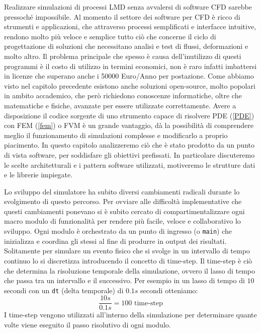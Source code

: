 Realizzare simulazioni di processi LMD senza avvalersi di software CFD sarebbe pressoché impossibile.
Al momento il settore dei software per CFD è ricco di strumenti e applicazioni, che attraverso processi semplificati e interfacce intuitive,
rendono molto più veloce e semplice tutto ciò che concerne il ciclo di progettazione di soluzioni che necessitano
analisi e test di flussi, deformazioni e molto altro.
Il problema principale che spesso è causa dell'inutilizzo di questi programmi è il costo di utilizzo in termini economici,
non è raro infatti imbattersi in licenze che superano anche i 50000 Euro/Anno per postazione.
Come abbiamo visto nel capitolo precedente esistono anche soluzioni open-source, molto popolari in ambito accademico, che però
richiedono conoscenze informatiche, oltre che matematiche e fisiche, avanzate per essere utilizzate correttamente. Avere a disposizione
il codice sorgente di uno strumento capace di risolvere PDE (\ref{PDE}) con FEM (\ref*{fem}) o FVM è un grande vantaggio, dà la possibilità di
comprendere meglio il funzionamento di simulazioni complesse e modificarlo a proprio piacimento.
In questo capitolo analizzeremo ciò che è stato prodotto da un punto di vista software, per soddisfare gli obiettivi prefissati.
In particolare discuteremo le scelte architetturali e i pattern software utilizzati, motiveremo le strutture dati e le librerie impiegate.

Lo sviluppo del simulatore ha subito diversi cambiamenti radicali durante lo svolgimento di questo percorso. Per ovviare alle difficoltà implementative
che questi cambiamenti ponevano si è subito cercato di compartimentalizzare ogni macro modulo di funzionalità per rendere più facile, veloce e collaborativo lo sviluppo.
Ogni modulo è orchestrato da un punto di ingresso (o \texttt{main}) che inizializza e coordina gli stessi al fine di produrre in output dei risultati.
Solitamente per simulare un evento fisico che si svolge in un intervallo di tempo continuo lo si discretizza introducendo il concetto di time-step. Il time-step
è ciò che determina la risoluzione temporale della simulazione, ovvero il lasso di tempo che passa tra un intervallo e il successivo.
Per esempio in un lasso di tempo di \(10\) secondi con un \texttt{dt} (delta temporale) di \(0.1s\) secondi otteniamo:
\[
    \frac{10s}{0.1s}=100 \text{ time-step}
\]
I time-step vengono utilizzati all'interno della simulazione per determinare quante volte viene eseguito il passo risolutivo di ogni modulo.

